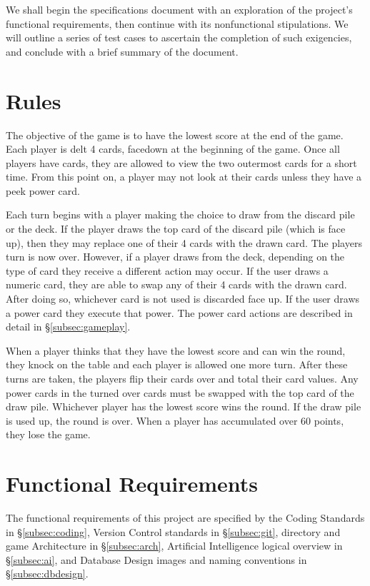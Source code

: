 \documentclass[12pt]{IEEEtran}
\begin{document}
	We shall begin the specifications document with an exploration of the project’s functional requirements, then continue with its nonfunctional stipulations. We will outline a series of test cases to ascertain the completion of such exigencies, and conclude with a brief summary of the document.

\section{Rules}
\label{sec:rules}

	The objective of the game is to have the lowest score at the end of the game. Each player is delt 4 cards, facedown at the beginning of the game. Once all players have cards, they are allowed to view the two outermost cards for a short time. From this point on, a player may not look at their cards unless they have a peek power card. 

	Each turn begins with a player making the choice to draw from the discard pile or the deck. If the player draws the top card of the discard pile (which is face up), then they may replace one of their 4 cards with the drawn card. The players turn is now over. However, if a player draws from the deck, depending on the type of card they receive a different action may occur. If the user draws a numeric card, they are able to swap any of their 4 cards with the drawn card. After doing so, whichever card is not used is discarded face up. If the user draws a power card they execute that power. The power card actions are described in detail in \S\ref{subsec:gameplay}. 

	When a player thinks that they have the lowest score and can win the round, they knock on the table and each player is allowed one more turn. After these turns are taken, the players flip their cards over and total their card values. Any power cards in the turned over cards  must be swapped with the top card of the draw pile. Whichever player has the lowest score wins the round. If the draw pile is used up, the round is over. When a player has accumulated over 60 points, they lose the game. 

\section{Functional Requirements}
\label{sec:funcReq}
	The functional requirements of this project are specified by the Coding Standards in \S \ref{subsec:coding}, Version 			Control standards in \S \ref{subsec:git}, directory and game Architecture in \S 	\ref{subsec:arch}, Artificial Intelligence 		logical overview in \S \ref{subsec:ai}, and Database Design images and naming conventions in \S\ref{subsec:dbdesign}.
\end{document}
